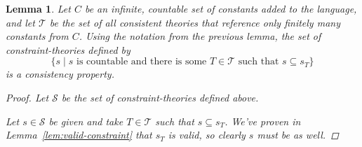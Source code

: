 \documentclass{amsart}
\newtheorem{lemma}[theorem]{Lemma}
\theoremstyle{definition}
\numberwithin{equation}{theorem}
\newcommand{\where}{\mid}
\begin{document}
\begin{lemma}\label{lem:proof-theoretic-consistency-property}
  Let $C$ be an infinite, countable set of constants added to the language, and let $\mathcal T$ be the set of all consistent theories that reference only finitely many constants from $C$.
  Using the notation from the previous lemma, the set of constraint-theories defined by
  \[
    \{s\where\text{$s$ is countable and there is some $T\in\mathcal T$ such that $s\subseteq s_T$}\}
  \]
  is a consistency property.
  \begin{proof}
    Let $\mathscr{S}$ be the set of constraint-theories defined above.
    
    Let $s\in \mathscr{S}$ be given and take $T\in\mathcal T$ such that $s\subseteq s_T$.
    We've proven in Lemma~\ref{lem:valid-constraint} that $s_T$ is valid, so clearly $s$ must be as well.
    

\end{proof}
\end{lemma}
\end{document}
